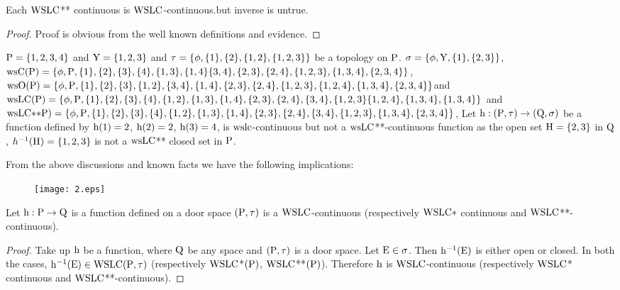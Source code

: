 \begin{thm}\label{thm7.3.5}
Each $\mathrm{WSLC}${*}{*} continuous is $\mathrm{WSLC}$-continuous.but inverse is untrue.
\end{thm}

\begin{proof}
Proof is obvious from the well known definitions and evidence.
\end{proof}

\begin{exm}\label{exam7.3.6}
$\mathrm{P} = \{1,2,3,4\}$ and $\mathrm{Y}= \{1,2,3\}$ and $\tau = \{\phi, \{1\},\{2\}, \{1,2\},\break \{1,2,3\}\}$ be a topology on $\mathrm{P}$. $\sigma = \{\phi, \mathrm{Y}, \{1\},\{ 2, 3\}\}$, $\ws\TSC(\TSP) = \{\phi, \TSP,\{1\}, \{2\}, \{3\},\break \{4\}, \{1,3\}, \{1, 4\} \{3,4\}, \{2,3\}, \{2,4\}, \{1,2, 3\},\{1,3,4\},\{2,3,4\}\}$, $\ws\TSO(\TSP) = \{\phi, \TSP,\break \{1\}, \{2\}, \{3\},\{1,2\}, \{3,4\}, \{1,4\}, \{2,3\}, \{2,4\}, \{1,2,3\}, \{1,2,4\},\{1,3,4\},\{2,3,4\}\}$\break and $\ws\LC(\TSP)= \{\phi, \TSP ,\{1\}, \{2\}, \{3\},\{4\},\{1,2\},\{1,3\}, \{1,4\}, \{2,3\}, \{2,4\},\{3,4\},\break \{1,2,3\}\{1,2,4\},\{1,3,4\},\{1,3,4\}\}$ and $\ws\LC{*}{*}\TSP)= \{\phi, \TSP,\{1\}, \{2\}, \{3\},\{4\},\{1,2\},\break \{1,3\}, \{1,4\}, \{2,3\}, \{2,4\},\{3,4\}, \{1, 2, 3\},\{1,3,4\},\{2,3,4\}\}$, Let $\mathrm{h}: (\mathrm{P}, \tau )\to(\mathrm{Q}, \sigma)$ be a function defined by $\mathrm{h}(1)= 2$, $\mathrm{h}(2)=2$, $\mathrm{h}(3)=4$, is $\mathrm{ws}\mathrm{lc}$-continuous but not a $\mathrm{ws}\mathrm{LC}${*}{*}-continuous function as the open set $\mathrm{H}=\{2,3\}$ in $\mathrm{Q}$, $h^{-1} (\mathrm{H})=\{1,2,3\}$ is not a $\mathrm{ws}\mathrm{LC}${*}{*} closed set in $\mathrm{P}$.
\end{exm}

\begin{rem}\label{rem7.3.1}
From the above discussions and known facts we have the following implications:
\begin{figure}[H]
\centering
\texttt{[image: 2.eps]}
\end{figure}
\end{rem}

\begin{thm}\label{thm7.3.6}
Let $\mathrm{h}: \mathrm{P} \to \mathrm{Q}$ is a function defined on a door space $(\mathrm{P},\tau)$ is a $\mathrm{WSLC}$-continuous (respectively $\mathrm{WSLC}*$ continuous and $\mathrm{WSLC}${*}{*}-continuous).
\end{thm}

\begin{proof}
Take up $\mathrm{h}$ be a function, where $\mathrm{Q}$ be any space and $(\mathrm{P}, \tau)$ is a door space. Let $\mathrm{E} \in \sigma$. Then $\mathrm{h}^{-1} (\mathrm{E})$ is either open or closed. In both the cases, $\mathrm{h}^{-1} (\mathrm{E}) \in \mathrm{WSLC}(\mathrm{P}, \tau)$ (respectively $\mathrm{WSLC}$*$(\mathrm{P})$, $\mathrm{WSLC}${*}{*}$(\mathrm{P})$). Therefore $\mathrm{h}$ is $\mathrm{WSLC}$-continuous (respectively $\mathrm{WSLC}$* continuous and $\mathrm{WSLC}${*}{*}-continuous).
\end{proof}

